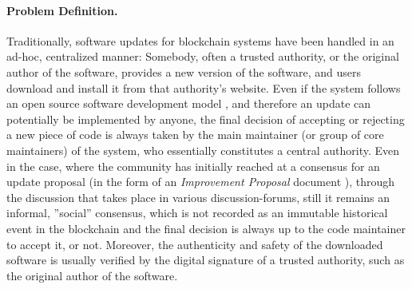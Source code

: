 

\paragraph{Problem Definition.} 
Traditionally, software updates for blockchain systems have been handled in an ad-hoc, centralized manner: Somebody, often a trusted authority, or the original author of the software, provides a new version of the software, and users
download and install it from that authority's website. Even if the system follows an open source software development model , and therefore an update can potentially be implemented by anyone, the final decision of accepting or rejecting a new piece of code is always taken by the main maintainer (or group of core maintainers) of the system, who essentially constitutes a central authority. Even in the case, where the community has initially reached at a consensus for an update proposal (in the form of an \emph{Improvement Proposal} document ), through the discussion that takes place in various discussion-forums, still it remains an informal, ''social'' consensus, which is not recorded as an immutable historical event in the blockchain and the final decision is always up to the code maintainer to accept it, or not. Moreover, the authenticity and safety of the downloaded software is usually verified by the digital signature of a trusted authority, such as the original author of the software.

